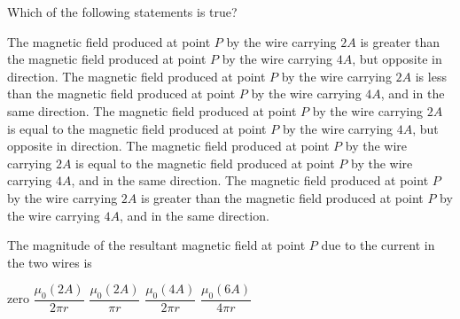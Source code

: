 \documentclass{../../../oss-apphys-exam}
\begin{document}
\begin{questions}

  \question Which of the following statements is true?
  \begin{choices}
    \choice The magnetic field produced at point $P$ by the wire carrying
    $2A$ is greater than the magnetic field produced at point $P$ by the wire
    carrying $4A$, but opposite in direction.
    \choice The magnetic field produced at point $P$ by the wire carrying
    $2A$ is less than the magnetic field produced at point $P$ by the wire
    carrying $4A$, and in the same direction.
    \choice The magnetic field produced at point $P$ by the wire carrying
    $2A$ is equal to the magnetic field produced at point $P$ by the wire
    carrying $4A$, but opposite in direction.
    \choice The magnetic field produced at point $P$ by the wire carrying
    $2A$ is equal to the magnetic field produced at point $P$ by the wire
    carrying $4A$, and in the same direction.
    \choice The magnetic field produced at point $P$ by the wire carrying
    $2A$ is greater than the magnetic field produced at point $P$ by the wire
    carrying $4A$, and in the same direction.
  \end{choices}
  \label{q:2wires1}

  \question The magnitude of the resultant magnetic field at point $P$ due to
  the current in the two wires is
  \begin{choices}
    \choice zero
    \choice $\dfrac{\mu_0(2A)}{2\pi r}$
    \choice $\dfrac{\mu_0(2A)}{\pi r}$
    \choice $\dfrac{\mu_0(4A)}{2\pi r}$
    \choice $\dfrac{\mu_0(6A)}{4\pi r}$
  \end{choices}
  \label{q:2wires2}


\end{questions}
\end{document}
